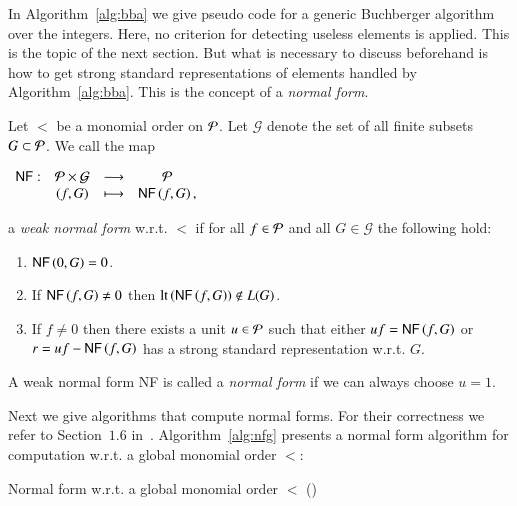In Algorithm~\ref{alg:bba} we give pseudo code for a generic Buchberger
algorithm over the integers. Here, no criterion for detecting useless elements
is applied. This is the topic of the next section. But what is necessary to
discuss beforehand is how to get strong standard representations of elements
handled by Algorithm~\ref{alg:bba}. This is the concept of a \emph{normal
form}.

\begin{definition}
Let $<$ be a monomial order on $\mathcal{P}$.
Let $\mathcal G$ denote the set of all finite subsets $G \subset \mathcal{P}$. We call
the map
\begin{center}
$
\begin{array}{rccc}
\text{\sffamily{NF}}: &\mathcal{P} \times \mathcal G &\longrightarrow& \mathcal{P}\\
                     & (f, G) &\longmapsto& \text{\sffamily{NF}}\left({f},{G}\right),
\end{array}
$
\end{center}
a \emph{weak normal form} w.r.t. $<$ if for all $f\in \mathcal{P}$ and all $G \in
\mathcal G$ the following hold:
\begin{enumerate}
\item $\text{\sffamily{NF}}\left({0},{G}\right) = 0$.
\item If $\text{\sffamily{NF}}\left({f},{G}\right) \neq 0$ then $\operatorname{lt}\left({\text{\sffamily{NF}}\left({f},{G}\right)}\right) \notin L(G)$.
\item If $f \neq 0$ then there exists a unit $u\in \mathcal{P}$ such that either
$uf = \text{\sffamily{NF}}\left({f},{G}\right)$ or
$r = uf - \text{\sffamily{NF}}\left({f},{G}\right)$ has a strong standard representation w.r.t. $G$.
\end{enumerate}
A weak normal form {\sffamily NF} is called a \emph{normal form} if we can always
choose $u=1$.
\end{definition}

Next we give algorithms that compute normal forms. For their correctness we
refer to Section~$1.6$ in~\cite{gpSingularBook2007}. Algorithm~\ref{alg:nfg}
presents a normal form algorithm for computation w.r.t. a global monomial order
$<$:

\begin{algorithm}
\caption{Normal form w.r.t. a global monomial order $<$
  (\nfn)} 
\label{alg:nfg}
\begin{algorithmic}[1]
\EndWhile
{}
\end{algorithmic}
\end{algorithm}

